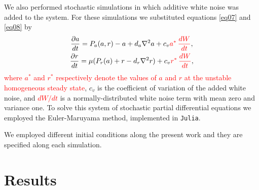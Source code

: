 \documentclass[%
 preprint,
 aip, 
 amsmath,amssymb,
]{revtex4-2}
\begin{document}
We also performed stochastic simulations in which additive white noise was added to the system. For these simulations we substituted equations \eqref{eq07} and
	\eqref{eq08} by
	\begin{subequations}\label{eq1112}
		\begin{gather}
		\frac{\partial a}{dt} = P_a(a, r) - a + d_a \nabla^2 a + c_v \textcolor{red}{a^* \,\frac{dW}{dt}}, \label{eq11} \\
		\frac{\partial r}{dt}= \mu (P_r(a) + r - d_r \nabla^2 r) + c_v \textcolor{red}{r^* \,\frac{dW}{dt}}, \label{eq12}
		\end{gather}
	\end{subequations}
\textcolor{red}{where $a^*$ and $r^*$ respectively denote the  values of  $a$ and $r$ at the unstable homogeneous steady state}, $c_v$ is the coefficient of variation of the added white noise, and \textcolor{red}{$dW/dt$} is a normally-distributed white noise term with mean zero and variance one. To solve this system of stochastic partial differential equations we employed the Euler-Maruyama method, implemented in \texttt{Julia}.
	
We employed different initial conditions along the present work and they are  specified along each simulation.

\section{Results}
\label{res}
	
\end{document}
